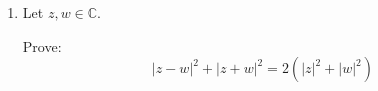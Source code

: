 \documentclass[12pt,letterpaper]{article}
\begin{document}
\begin{enumerate}
\begin{proof}
        Now let's subtract the first equation from the second.
        \[adx_2 - bcx_2 = (ad - bc)x_2 = 0\]

        Again, we assumed that $ad - bc \neq 0$ so we divide by $ad - bc$.
        \[x_2 = 0\]

        So $x_1 = x_2 = 0$.
        Thus if $ad - bc \neq 0$, then $x_1 = x_2 = 0$.

      \end{proof}

    \item
      Let $z, w \in \mathbb{C}$.

      Prove:
      \[|z - w|^2 + |z + w|^2 = 2(|z|^2 + |w|^2)\]
  \end{enumerate}
\end{document}
